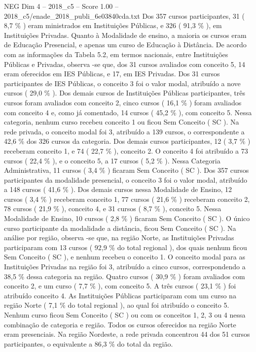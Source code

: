 \begin{textsample}{NEG Dim 4 – 2018\_c5 – Score 1.00 – 2018\_c5/enade\_2018\_publi\_6e03840cda.txt}
Dos 357 cursos participantes, 31 ( 8,7 \% ) eram ministrados em Instituições Públicas, e 326 ( 91,3 \% ), em Instituições Privadas.
Quanto à Modalidade de ensino, a maioria os cursos eram de Educação Presencial, e apenas um curso de Educação à Distância.
De acordo com as informações da Tabela 5.2, em termos nacionais, entre Instituições Públicas e Privadas, observa -se que, dos 31 cursos avaliados com conceito 5, 14 eram oferecidos em IES Públicas, e 17, em IES Privadas.
Dos 31 cursos participantes de IES Públicas, o conceito 3 foi o valor modal, atribuído a nove cursos ( 29,0 \% ).
Dos demais cursos de Instituições Públicas participantes, três cursos foram avaliados com conceito 2, cinco cursos ( 16,1 \% ) foram avaliados com conceito 4 e, como já comentado, 14 cursos ( 45,2 \% ), com conceito 5.
Nessa categoria, nenhum curso recebeu conceito 1 ou ficou Sem Conceito ( SC ).
Na rede privada, o conceito modal foi 3, atribuído a 139 cursos, o correspondente a 42,6 \% dos 326 cursos da categoria.
Dos demais cursos participantes, 12 ( 3,7 \% ) receberam conceito 1, e 74 ( 22,7 \% ), conceito 2.
O conceito 4 foi atribuído a 73 cursos ( 22,4 \% ), e o conceito 5, a 17 cursos ( 5,2 \% ).
Nessa Categoria Administrativa, 11 cursos ( 3,4 \% ) ficaram Sem Conceito ( SC ).
Dos 357 cursos participantes da modalidade presencial, o conceito 3 foi o valor modal, atribuído a 148 cursos ( 41,6 \% ).
Dos demais cursos nessa Modalidade de Ensino, 12 cursos ( 3,4 \% ) receberam conceito 1, 77 cursos ( 21,6 \% ) receberam conceito 2, 78 cursos ( 21,9 \% ), conceito 4, e 31 cursos ( 8,7 \% ), conceito 5.
Nessa Modalidade de Ensino, 10 cursos ( 2,8 \% ) ficaram Sem Conceito ( SC ).
O único curso participante da modalidade a distância, ficou Sem Conceito ( SC ).
Na análise por região, observa -se que, na região Norte, as Instituições Privadas participaram com 13 cursos ( 92,9 \% do total regional ), dos quais nenhum ficou Sem Conceito ( SC ), e nenhum recebeu o conceito 1.
O conceito modal para as Instituições Privadas na região foi 3, atribuído a cinco cursos, correspondendo a 38,5 \% dessa categoria na região.
Quatro cursos ( 30,9 \% ) foram avaliados com conceito 2, e um curso ( 7,7 \% ), com conceito 5.
A três cursos ( 23,1 \% ) foi atribuído conceito 4.
As Instituições Públicas participaram com um curso na região Norte ( 7,1 \% do total regional ), ao qual foi atribuído o conceito 5.
Nenhum curso ficou Sem Conceito ( SC ) ou com os conceitos 1, 2, 3 ou 4 nessa combinação de categoria e região.
Todos os cursos oferecidos na região Norte eram presenciais.
Na região Nordeste, a rede privada concentrou 44 dos 51 cursos participantes, o equivalente a 86,3 \% do total da região.

\end{textsample}
